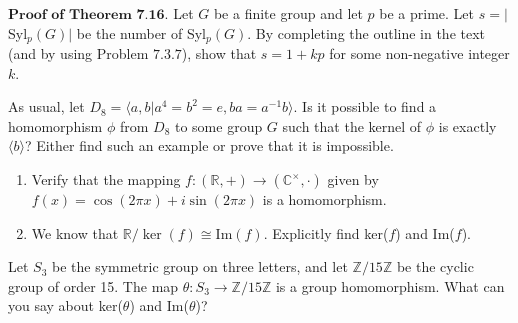 \documentclass[12pt,letterpaper,boxed]{hmcpset}
\begin{document}

\begin{problem}[7.3.9]
$\textbf{Proof of Theorem 7.16.}$ Let $G$ be a finite group and let $p$ be a prime. Let $ s = \vert$Syl$_p(G) \vert$ be the number of Syl$_p(G)$. By completing the outline in the text (and by using Problem $\textit{7.3.7}$), show that $ s = 1 + kp $ for some non-negative integer $k$.
\end{problem}

\begin{solution}
\end{solution}

\clearpage

\begin{problem}[11.3.1]
As usual, let $D_8 = \langle a,b \vert a^4 = b^2 = e, ba = a^{-1}b \rangle$. Is it possible to find a homomorphism $\phi$ from $D_8$ to some group $G$ such that the kernel of $\phi$ is exactly $\langle b \rangle$? Either find such an example or prove that it is impossible. 
\end{problem}

\begin{solution}
\end{solution}

\clearpage

\begin{problem}[11.3.3]
\begin{enumerate}[label=\alph*]
\item Verify that the mapping $ f:(\mathbb{R},+) \rightarrow (\mathbb{C}^{\times}, \cdot) $ given by $f(x) = \cos(2\pi x) + i\sin(2 \pi x) $ is a homomorphism. 
\item We know that $\mathbb{R}/\ker(f) \cong \text{Im}(f)$. Explicitly find ker($f$) and Im($f$).
\end{enumerate}
\end{problem}

\begin{solution}
\end{solution}

\clearpage

\begin{problem}[11.3.6]
Let $ S_3 $ be the symmetric group on three letters, and let $\mathbb{Z}/15\mathbb{Z}$ be the cyclic group of order 15. The map $\theta: S_3 \rightarrow \mathbb{Z}/15\mathbb{Z}$ is a group homomorphism. What can you say about ker($\theta$) and Im($\theta$)?
\end{problem}
\end{document}
